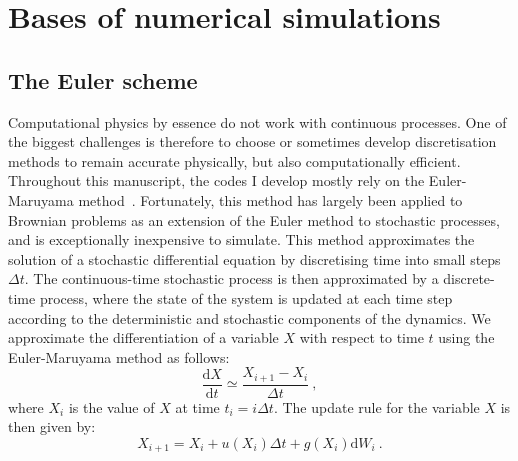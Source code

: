 \section{Bases of numerical simulations}

\subsection{The Euler scheme}
\label{subsec:eulerscheme}
Computational physics by essence do not work with continuous processes. One of the biggest challenges is therefore to choose or sometimes develop discretisation methods to remain accurate physically, but also computationally efficient. Throughout this manuscript, the codes I develop mostly rely on the Euler-Maruyama method~\cite{Maruyama1955,KloedenPlaten1992,Higham2001}. Fortunately, this method has largely been applied to Brownian problems as an extension of the Euler method to stochastic processes, and is exceptionally inexpensive to simulate. This method approximates the solution of a stochastic differential equation by discretising time into small steps $\Delta t$. The continuous-time stochastic process is then approximated by a discrete-time process, where the state of the system is updated at each time step according to the deterministic and stochastic components of the dynamics. We approximate the differentiation of a variable $X$ with respect to time $t$ using the Euler-Maruyama method as follows:
\begin{equation}
    \dfrac{\mathrm{d}X}{\mathrm{d}t} \simeq \dfrac{X_{i+1} - X_i}{\Delta t}~,
\end{equation}
where $X_i$ is the value of $X$ at time $t_i = i \Delta t$. The update rule for the variable $X$ is then given by:
\begin{equation}
    X_{i+1} = X_i + u(X_i)\Delta t + g(X_i)\mathrm{d}W_i~.
\end{equation}

